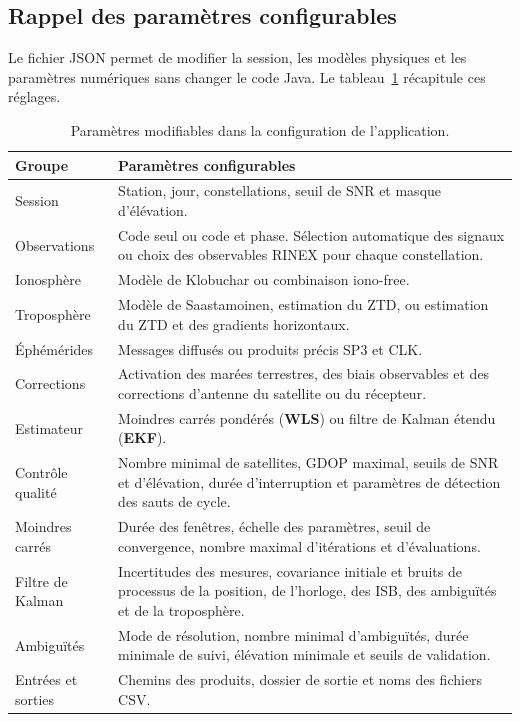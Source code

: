 \subsection{Rappel des paramètres configurables}
\label{sec:validation_configuration}

Le fichier JSON permet de modifier la session, les modèles physiques et les
paramètres numériques sans changer le code Java. Le
tableau~\ref{tab:validation_configuration_options} récapitule ces réglages.

\begin{table}[htbp]
\centering
\small
\begin{tabularx}{\textwidth}{|>{\raggedright\arraybackslash}p{}|
                                  >{\raggedright\arraybackslash}X|}
\hline
\textbf{Groupe} & \textbf{Paramètres configurables} \\
\hline
Session & Station, jour, constellations, seuil de SNR et masque d'élévation. \\
\hline
Observations & Code seul ou code et phase. Sélection automatique des signaux
ou choix des observables RINEX pour chaque constellation. \\
\hline
Ionosphère & Modèle de Klobuchar ou combinaison iono-free. \\
\hline
Troposphère & Modèle de Saastamoinen, estimation du ZTD, ou estimation du ZTD
et des gradients horizontaux. \\
\hline
Éphémérides & Messages diffusés ou produits précis SP3 et CLK. \\
\hline
Corrections & Activation des marées terrestres, des biais observables et des
corrections d'antenne du satellite ou du récepteur. \\
\hline
Estimateur & Moindres carrés pondérés (\textbf{WLS}) ou filtre de Kalman étendu
(\textbf{EKF}). \\
\hline
Contrôle qualité & Nombre minimal de satellites, GDOP maximal, seuils de
SNR et d'élévation, durée d'interruption et paramètres de détection des sauts
de cycle. \\
\hline
Moindres carrés & Durée des fenêtres, échelle des paramètres, seuil de
convergence, nombre maximal d'itérations et d'évaluations. \\
\hline
Filtre de Kalman & Incertitudes des mesures, covariance initiale et bruits de
processus de la position, de l'horloge, des ISB, des ambiguïtés et de la
troposphère. \\
\hline
Ambiguïtés & Mode de résolution, nombre minimal d'ambiguïtés, durée minimale de
suivi, élévation minimale et seuils de validation. \\
\hline
Entrées et sorties & Chemins des produits, dossier de sortie et noms des
fichiers CSV. \\
\hline
\end{tabularx}
\caption{Paramètres modifiables dans la configuration de l'application.}
\label{tab:validation_configuration_options}
\end{table}

